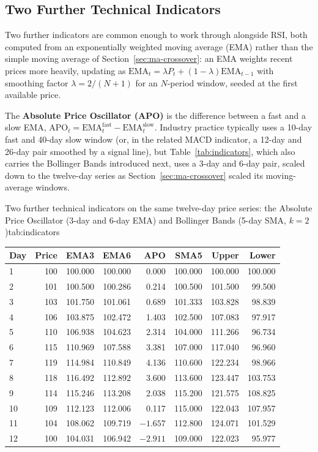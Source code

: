 \documentclass[../ai_in_finance]{subfiles}
\begin{document}
\subsection{Two Further Technical Indicators}
\label{sec:technical-indicators}

Two further indicators are common enough to work through alongside RSI, both computed from an exponentially weighted moving average (EMA) rather than the simple moving average of Section~\ref{sec:ma-crossover}: an EMA weights recent prices more heavily, updating as $\text{EMA}_t = \lambda P_t + (1-\lambda)\text{EMA}_{t-1}$ with smoothing factor $\lambda = 2/(N+1)$ for an $N$-period window, seeded at the first available price.

The \textbf{Absolute Price Oscillator (APO)} is the difference between a fast and a slow EMA, $\text{APO}_t = \text{EMA}^{\text{fast}}_t - \text{EMA}^{\text{slow}}_t$. Industry practice typically uses a 10-day fast and 40-day slow window (or, in the related MACD indicator, a 12-day and 26-day pair smoothed by a signal line), but Table~\ref{tab:indicators}, which also carries the Bollinger Bands introduced next, uses a 3-day and 6-day pair, scaled down to the twelve-day series as Section~\ref{sec:ma-crossover} scaled its moving-average windows.

\begin{booktable}[htbp]{Two further technical indicators on the same twelve-day price series: the Absolute Price Oscillator (3-day and 6-day EMA) and Bollinger Bands (5-day SMA, $k=2$)}{tab:indicators}
\begin{tabular}{lrrrrrrr}
\toprule
Day & Price & EMA3 & EMA6 & APO & SMA5 & Upper & Lower \\
\midrule
1  & 100 & 100.000 & 100.000 & 0.000 & 100.000 & 100.000 & 100.000 \\
2  & 101 & 100.500 & 100.286 & 0.214 & 100.500 & 101.500 & 99.500 \\
3  & 103 & 101.750 & 101.061 & 0.689 & 101.333 & 103.828 & 98.839 \\
4  & 106 & 103.875 & 102.472 & 1.403 & 102.500 & 107.083 & 97.917 \\
5  & 110 & 106.938 & 104.623 & 2.314 & 104.000 & 111.266 & 96.734 \\
6  & 115 & 110.969 & 107.588 & 3.381 & 107.000 & 117.040 & 96.960 \\
7  & 119 & 114.984 & 110.849 & 4.136 & 110.600 & 122.234 & 98.966 \\
8  & 118 & 116.492 & 112.892 & 3.600 & 113.600 & 123.447 & 103.753 \\
9  & 114 & 115.246 & 113.208 & 2.038 & 115.200 & 121.575 & 108.825 \\
10 & 109 & 112.123 & 112.006 & 0.117 & 115.000 & 122.043 & 107.957 \\
11 & 104 & 108.062 & 109.719 & $-1.657$ & 112.800 & 124.071 & 101.529 \\
12 & 100 & 104.031 & 106.942 & $-2.911$ & 109.000 & 122.023 & 95.977 \\
\bottomrule
\end{tabular}
\end{booktable}
\end{document}
